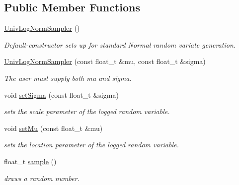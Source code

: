 \subsection*{Public Member Functions}
\begin{DoxyCompactItemize}
\item 
\mbox{\label{classrvsamp_1_1UnivLogNormSampler_aa31a7d6a486257b4a8404b74c7887b11}} 
\hyperlink{classrvsamp_1_1UnivLogNormSampler_aa31a7d6a486257b4a8404b74c7887b11}{Univ\+Log\+Norm\+Sampler} ()
\begin{DoxyCompactList}\small\item\em Default-\/constructor sets up for standard Normal random variate generation. \end{DoxyCompactList}\item 
\hyperlink{classrvsamp_1_1UnivLogNormSampler_a679213457584e98a7dc205a9b7d6a0cd}{Univ\+Log\+Norm\+Sampler} (const float\+\_\+t \&mu, const float\+\_\+t \&sigma)
\begin{DoxyCompactList}\small\item\em The user must supply both mu and sigma. \end{DoxyCompactList}\item 
void \hyperlink{classrvsamp_1_1UnivLogNormSampler_a21bdbf5f20b327f5905605dd0357c8b8}{set\+Sigma} (const float\+\_\+t \&sigma)
\begin{DoxyCompactList}\small\item\em sets the scale parameter of the logged random variable. \end{DoxyCompactList}\item 
void \hyperlink{classrvsamp_1_1UnivLogNormSampler_a43c00fb2c560c1444ccdee13060c5153}{set\+Mu} (const float\+\_\+t \&mu)
\begin{DoxyCompactList}\small\item\em sets the location parameter of the logged random variable. \end{DoxyCompactList}\item 
float\+\_\+t \hyperlink{classrvsamp_1_1UnivLogNormSampler_a816c87875ed08b4b90f9fbe3fd4bda88}{sample} ()
\begin{DoxyCompactList}\small\item\em draws a random number. \end{DoxyCompactList}\end{DoxyCompactItemize}
